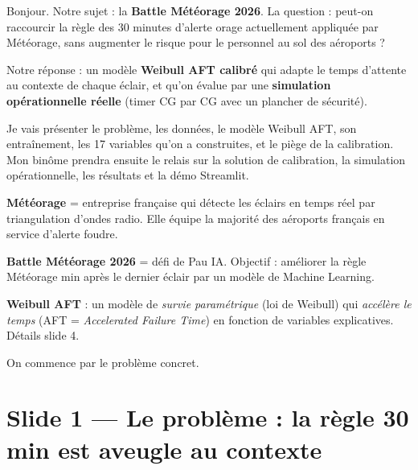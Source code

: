 \documentclass[11pt,a4paper]{article}
\begin{document}
\begin{dire}
\og Bonjour. Notre sujet : la \textbf{Battle Météorage 2026}. La question : peut-on raccourcir
la règle des 30 minutes d'alerte orage actuellement appliquée par Météorage, sans augmenter
le risque pour le personnel au sol des aéroports ?

Notre réponse : un modèle \textbf{Weibull AFT calibré} qui adapte le temps d'attente au
contexte de chaque éclair, et qu'on évalue par une \textbf{simulation opérationnelle réelle}
(timer CG par CG avec un plancher de sécurité).

Je vais présenter le problème, les données, le modèle Weibull AFT, son entraînement,
les 17 variables qu'on a construites, et le piège de la calibration. Mon binôme prendra
ensuite le relais sur la solution de calibration, la simulation opérationnelle, les
résultats et la démo Streamlit. \fg{}
\end{dire}

\begin{compr}
\textbf{Météorage} = entreprise française qui détecte les éclairs en temps réel par
triangulation d'ondes radio. Elle équipe la majorité des aéroports français en service
d'alerte foudre.

\textbf{Battle Météorage 2026} = défi de Pau IA. Objectif : améliorer la règle Météorage
 min après le dernier éclair \fg{} par un modèle de Machine Learning.

\textbf{Weibull AFT} : un modèle de \emph{survie paramétrique} (loi de Weibull) qui
\emph{accélère le temps} (AFT = \textit{Accelerated Failure Time}) en fonction de variables
explicatives. Détails slide 4.
\end{compr}

\begin{transit}
\og On commence par le problème concret. \fg{}
\end{transit}

\section{Slide 1 — Le problème : la règle 30 min est aveugle au contexte}
\end{document}
